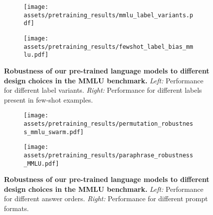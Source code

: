 \begin{figure}[t]
    \centering
    \begin{subfigure}[b]{0.49\textwidth}
        \texttt{[image: assets/pretraining\_results/mmlu\_label\_variants.pdf]}
        \label{figure:mmlu_label_variants}
    \end{subfigure}
    \hspace{5mm}
    \begin{subfigure}[b]{0.33\textwidth}
        \texttt{[image: assets/pretraining\_results/fewshot\_label\_bias\_mmlu.pdf]}
        \label{figure:fewshot_label_bias_mmlu}
    \end{subfigure}
    \caption{\textbf{Robustness of our pre-trained language models to different design choices in the MMLU benchmark.} \emph{Left:} Performance for different label variants.  \emph{Right:} Performance for different labels present in few-shot examples. }
    \label{figure:robustness1}
\end{figure}

\begin{figure}[t]
    \centering
    \begin{subfigure}[b]{0.47\textwidth}
        \texttt{[image: assets/pretraining\_results/permutation\_robustness\_mmlu\_swarm.pdf]}
        \label{figure:permutation_robustness_swarm}
    \end{subfigure}
    \begin{subfigure}[b]{0.47\textwidth}
        \texttt{[image: assets/pretraining\_results/paraphrase\_robustness\_MMLU.pdf]}
        \label{figure:mmlu_paraphrases}
    \end{subfigure}
    \caption{\textbf{Robustness of our pre-trained language models to different design choices in the MMLU benchmark.} \emph{Left:} Performance for different answer orders. \emph{Right:} Performance for different prompt formats.}\label{fig:permutation_robustness}
    \label{figure:robustness2}
\end{figure}

